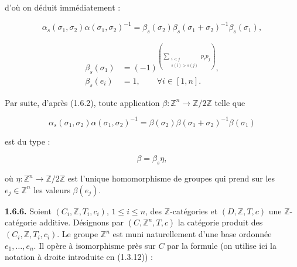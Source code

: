 %
d'où on déduit immédiatement :

\begin{equation*}
  \alpha_s(\sigma_1,\sigma_2)\alpha(\sigma_1,\sigma_2)^{-1}
  =\beta_s(\sigma_2)\beta_s(\sigma_1+\sigma_2)^{-1}\beta_s(\sigma_1),
\end{equation*}

\begin{equation}
  \begin{aligned}
    \beta_s(\sigma_1)
      &=(-1)^{\left(
          \sum_{\substack{i<j\\s(i)>s(j)}}p_i p_j
        \right)},\\
    \beta_s(e_i)&=1,
      \qquad \forall i\in[1,n].
  \end{aligned}
  \tag{1.6.5.3}
\end{equation}

Par suite, d'après (1.6.2), toute application
$\beta\colon\mathbb Z^n\longrightarrow\mathbb Z/2\mathbb Z$ telle que

\begin{equation}
  \alpha_s(\sigma_1,\sigma_2)\alpha(\sigma_1,\sigma_2)^{-1}
  =\beta(\sigma_2)\beta(\sigma_1+\sigma_2)^{-1}\beta(\sigma_1)
  \tag{1.6.5.4}
\end{equation}

est du type :

\begin{equation}
  \beta=\beta_s\eta,
  \tag{1.6.5.5}
\end{equation}

où $\eta\colon\mathbb Z^n\longrightarrow\mathbb Z/2\mathbb Z$ est
l'unique homomorphisme de groupes qui prend sur les
$e_j\in\mathbb Z^n$ les valeurs $\beta(e_j)$.

\noindent\textbf{1.6.6.}\quad
Soient $(C_i,\mathbb Z,T_i,c_i)$, $1\leq i\leq n$, des
$\mathbb Z$-catégories et $(D,\mathbb Z,T,c)$ une $\mathbb Z$-catégorie
additive. Désignons par $(C,\mathbb Z^n,T,c)$ la catégorie produit des
$(C_i,\mathbb Z,T_i,c_i)$. Le groupe $\mathbb Z^n$ est muni
naturellement d'une base ordonnée $e_1,\ldots,e_n$. Il opère à
isomorphisme près sur $C$ par la formule (on utilise ici la notation à
droite introduite en (1.3.12)) :

